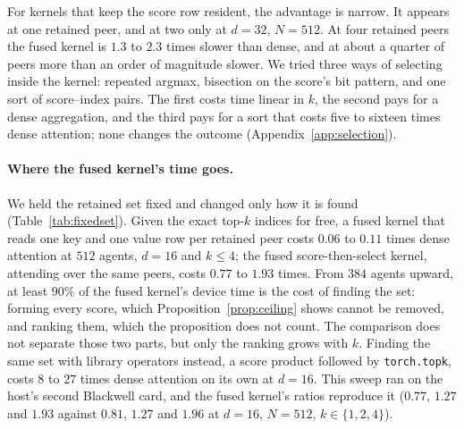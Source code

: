 For kernels that keep the score row resident, the advantage is narrow. It
appears at one retained peer, and at two only at $d{=}32$, $N{=}512$. At four
retained peers the fused kernel is $1.3$ to $2.3$ times slower than dense, and
at about a quarter of peers more than an order of magnitude slower. We tried three
ways of selecting inside the kernel: repeated argmax, bisection on the score's
bit pattern, and one sort of score--index pairs. The first costs time linear in
$k$, the second pays for a dense aggregation, and the third pays for a sort that
costs five to sixteen times dense attention; none changes the outcome
(Appendix~\ref{app:selection}).

\begin{table}[t]
\centering\small
\caption{One retained set, reached two ways: found by scoring inside the fused
score-then-select kernel, or handed to a fused kernel that attends over a given
set. Both compute exact top-$k$ attention over the same peers (maximum deviation
from the reference $2.4\times10^{-6}$). Ratios of minima against the best dense implementation, under CUDA-graph replay so that all are device times. For the score-then-select kernel the median of the per-repetition paired ratios is within $3.3\%$ of the ratio of minima, with a $95\%$ bootstrap interval within $\pm0.8\%$; for the fixed-set kernel, which runs for a few microseconds, within $14\%$ and $\pm3.4\%$. The last column is the share of the fused kernel's time not accounted
for by attending over the set, across the five $k$.}
\label{tab:fixedset}

\end{table}

\paragraph{Where the fused kernel's time goes.} We held the retained set fixed
and changed only how it is found (Table~\ref{tab:fixedset}). Given the exact
top-$k$ indices for free, a fused kernel that reads one key and one value row
per retained peer costs $0.06$ to $0.11$ times dense attention at $512$ agents,
$d{=}16$ and $k \le 4$; the fused score-then-select kernel, attending over the
same peers, costs $0.77$ to $1.93$ times. From $384$ agents upward, at least
$90\%$ of the fused kernel's device time is the cost of finding the set: forming
every score, which Proposition~\ref{prop:ceiling} shows cannot be removed, and
ranking them, which the proposition does not count. The comparison does not
separate those two parts, but only the ranking grows with $k$. Finding the same
set with library operators instead, a score product followed by
\texttt{torch.topk}, costs $8$ to $27$ times dense attention on its own at
$d{=}16$. This sweep ran on the host's second Blackwell card, and
the fused kernel's ratios reproduce it ($0.77$, $1.27$ and $1.93$ against
$0.81$, $1.27$ and $1.96$ at $d{=}16$, $N{=}512$, $k \in \{1,2,4\}$).

